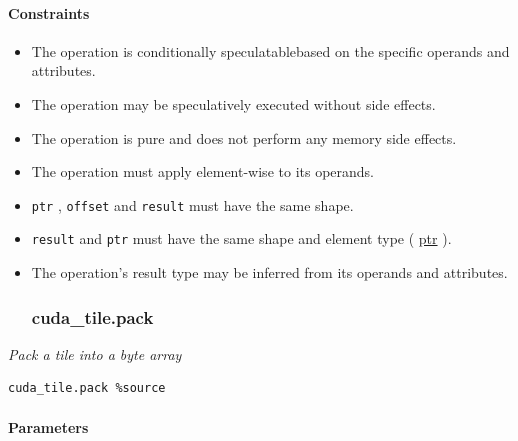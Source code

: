 \documentclass{article}
\begin{document}
\paragraph{Constraints}

\begin{itemize}
\item The operation is conditionally speculatablebased on the specific operands and attributes.
\item The operation may be speculatively executed without side effects.
\item The operation is pure and does not perform any memory side effects.
\item The operation must apply element-wise to its operands.
\item \texttt{ptr} , \texttt{offset} and \texttt{result} must have the same shape.
\item \texttt{result} and \texttt{ptr} must have the same shape and element type ( \href{https://docs.nvidia.com/cuda/tile-ir/latest/sections/types.html#type-ptr}{ptr} ).
\item The operation's result type may be inferred from its operands and attributes.


\subsubsection{cuda\_tile.pack}

\end{itemize}
\textit{Pack a tile into a byte array}


\begin{lstlisting}
cuda_tile.pack %source
\end{lstlisting}

\paragraph{Parameters}
\end{document}
